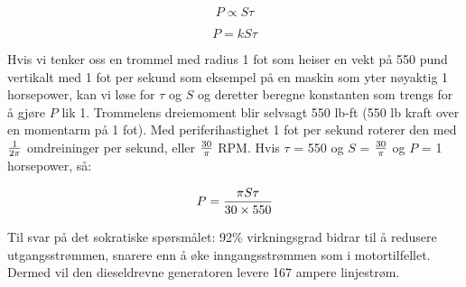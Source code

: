$$P \propto S \tau $$

$$P = k S \tau $$

Hvis vi tenker oss en trommel med radius 1 fot som heiser en vekt på 550 pund vertikalt med 1 fot per sekund som eksempel på en maskin som yter nøyaktig 1 horsepower, kan vi løse for $\tau$ og $S$ og deretter beregne konstanten som trengs for å gjøre $P$ lik 1. Trommelens dreiemoment blir selvsagt 550 lb-ft (550 lb kraft over en momentarm på 1 fot). Med periferihastighet 1 fot per sekund roterer den med $1 \over {2 \pi}$ omdreininger per sekund, eller $30 \over \pi$ RPM. Hvis $\tau$ = 550 og $S$ = $30 \over \pi$ og $P$ = 1 horsepower, så:

$$P = {\pi S \tau \over {30 \times 550}}$$

\vskip 10pt

Til svar på det sokratiske spørsmålet: 92\% virkningsgrad bidrar til å redusere utgangsstrømmen, snarere enn å øke inngangsstrømmen som i motortilfellet. Dermed vil den dieseldrevne generatoren levere 167 ampere linjestrøm.











